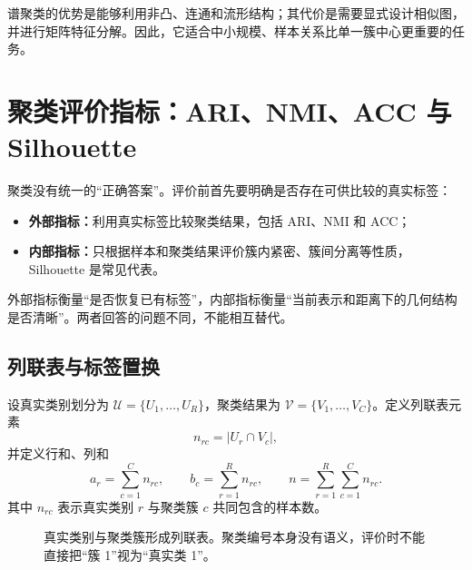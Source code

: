 \documentclass[UTF8,zihao=-4,openany]{ctexbook}
\begin{document}
谱聚类的优势是能够利用非凸、连通和流形结构；其代价是需要显式设计相似图，并进行矩阵特征分解。因此，它适合中小规模、样本关系比单一簇中心更重要的任务。

\clearpage
\section{聚类评价指标：ARI、NMI、ACC 与 Silhouette}

聚类没有统一的“正确答案”。评价前首先要明确是否存在可供比较的真实标签：

\begin{itemize}
  \item \textbf{外部指标：}利用真实标签比较聚类结果，包括 ARI、NMI 和 ACC；
  \item \textbf{内部指标：}只根据样本和聚类结果评价簇内紧密、簇间分离等性质，Silhouette 是常见代表。
\end{itemize}

外部指标衡量“是否恢复已有标签”，内部指标衡量“当前表示和距离下的几何结构是否清晰”。两者回答的问题不同，不能相互替代。

\subsection{列联表与标签置换}

设真实类别划分为
\(
\mathcal U=\{U_1,\ldots,U_R\}
\)，聚类结果为
\(
\mathcal V=\{V_1,\ldots,V_C\}
\)。定义列联表元素
\begin{equation}
  n_{rc}=|U_r\cap V_c|,
  \label{eq:contingency-cell}
\end{equation}
并定义行和、列和
\[
  a_r=\sum_{c=1}^{C}n_{rc},
  \qquad
  b_c=\sum_{r=1}^{R}n_{rc},
  \qquad
  n=\sum_{r=1}^{R}\sum_{c=1}^{C}n_{rc}.
\]
其中 \(n_{rc}\) 表示真实类别 \(r\) 与聚类簇 \(c\) 共同包含的样本数。

\begin{figure}[htbp]
  \centering
  \caption{真实类别与聚类簇形成列联表。聚类编号本身没有语义，评价时不能直接把“簇 1”视为“真实类 1”。}
  \label{fig:clustering-contingency-table}
\end{figure}
\end{document}
